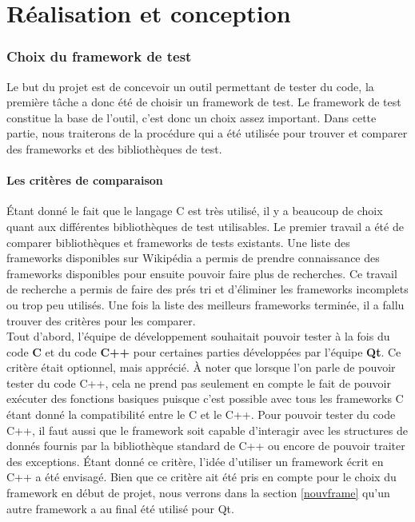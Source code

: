 \documentclass[a4paper]{article}
\begin{document}
\part{Réalisation et conception}

\section{Choix du framework de test}%

Le but du projet est de concevoir un outil permettant de tester du code, la
première tâche a donc été de choisir un framework de test. Le framework de test
constitue la base de l'outil, c'est donc un choix assez important. Dans cette
partie, nous traiterons de la procédure qui a été utilisée pour trouver et
comparer des frameworks et des bibliothèques de test.

\subsection{Les critères de comparaison}%

Étant donné le fait que le langage C est très utilisé, il y a beaucoup de choix
quant aux différentes bibliothèques de test utilisables. Le premier travail a
été de comparer bibliothèques et frameworks de tests existants. Une liste des
frameworks disponibles sur Wikipédia \cite{enwikiframeworks} a permis de prendre
connaissance des frameworks disponibles pour ensuite pouvoir faire plus de
recherches. Ce travail de recherche a permis de faire des prés tri et d'éliminer
les frameworks incomplets ou trop peu utilisés. Une fois la liste des meilleurs
frameworks terminée, il a fallu trouver des critères pour les comparer.\\

Tout d'abord, l'équipe de développement souhaitait pouvoir tester à la fois du
code \textbf{C} et du code \textbf{C++} pour certaines parties développées par
l'équipe \textbf{Qt}. Ce critère était optionnel, mais apprécié. À noter que
lorsque l'on parle de pouvoir tester du code C++, cela ne prend pas seulement en
compte le fait de pouvoir exécuter des fonctions basiques puisque c'est possible
avec tous les frameworks C étant donné la compatibilité entre le C et le C++.
Pour pouvoir tester du code C++, il faut aussi que le framework soit capable
d'interagir avec les structures de donnés fournis par la bibliothèque standard
de C++ ou encore de pouvoir traiter des exceptions. Étant donné ce critère,
l'idée d'utiliser un framework écrit en C++ a été envisagé. Bien que ce critère
ait été pris en compte pour le choix du framework en début de projet, nous
verrons dans la section \ref{nouvframe} qu'un autre framework a au final été
utilisé pour Qt.
\end{document}

